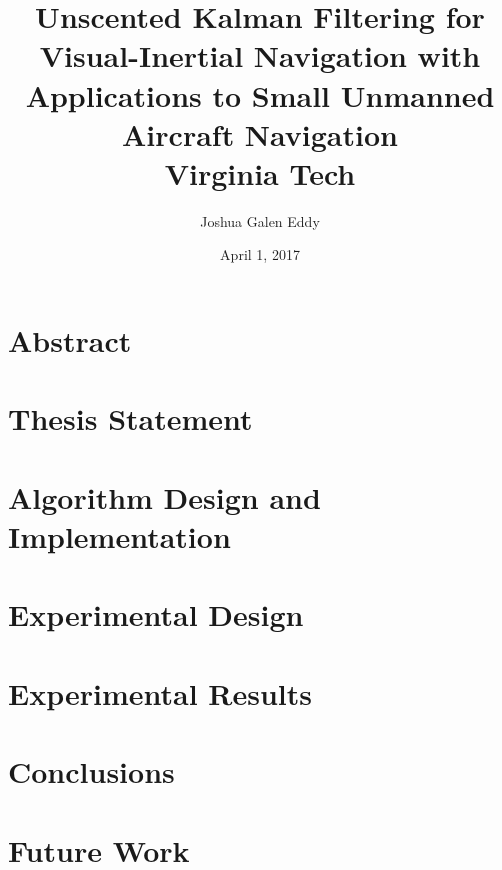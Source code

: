 \documentclass[11 pt]{report}
\begin{document}
\title{
	{Unscented Kalman Filtering for Visual-Inertial Navigation with Applications to Small Unmanned Aircraft Navigation}\\
	\vspace{1 em}
	{\Large Virginia Tech}
}
\author{Joshua Galen Eddy}
\date{April 1, 2017}

\maketitle

\chapter*{Abstract}



\tableofcontents
\listoffigures
\listoftables





\chapter{Thesis Statement}

\chapter{Algorithm Design and Implementation}

\chapter{Experimental Design}

\chapter{Experimental Results}

\chapter{Conclusions}

\chapter{Future Work}

\appendix

\clearpage
{}
\end{document}
